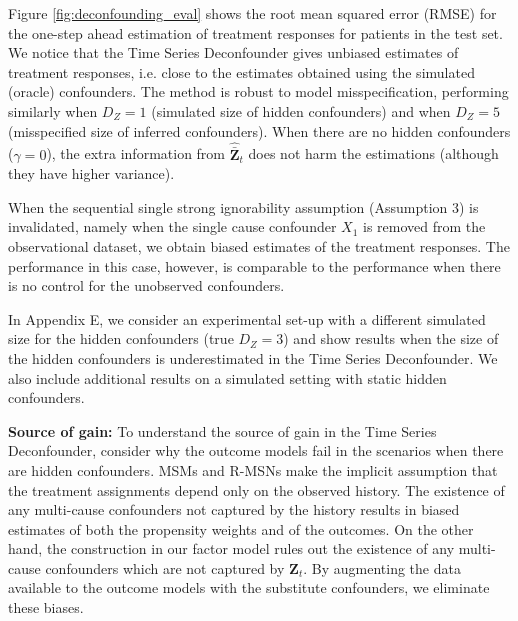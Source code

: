 \documentclass{article}
\newcommand{\vc}[1]{\mathbf{#1}}
\newcommand{\hist}[1]{\bar{\vc{#1}}}
\begin{document}
	Figure \ref{fig:deconfounding_eval} shows the root mean squared error (RMSE) for the one-step ahead estimation of treatment responses for patients in the test set. We notice that the Time Series Deconfounder gives unbiased estimates of treatment responses, i.e. close to the estimates obtained using the simulated (oracle) confounders.  The method is robust to model misspecification, performing similarly when $D_Z= 1$ (simulated size of hidden confounders) and when $D_Z=5$ (misspecified size of inferred confounders). When there are no hidden confounders ($\gamma = 0$), the extra information from $\hat{\hist{Z}}_t$ does not harm the estimations (although they have higher variance). 
	
	When the sequential single strong ignorability assumption (Assumption 3) is invalidated, namely when the single cause confounder $X_1$ is removed from the observational dataset, we obtain biased estimates of the treatment responses. The performance in this case, however, is comparable to the performance when there is no control for the unobserved confounders.     
	
    In Appendix E, we consider an experimental set-up with a 
    different simulated size for the hidden confounders (true $D_Z = 3$) and show results when the size of the hidden confounders is underestimated in the Time Series Deconfounder. We also include 
    additional results on a simulated setting with static hidden confounders. 
	
	\textbf{Source of gain:}   To understand the source of gain in the Time Series Deconfounder, consider why the outcome models fail in the scenarios when there are hidden confounders. MSMs and R-MSNs make the implicit assumption that the treatment assignments depend only on the observed history.  The existence of any multi-cause confounders not captured by the history results in biased estimates of both the propensity weights and of the outcomes. On the other hand, the construction in our factor model rules out the existence of any multi-cause confounders which are not captured by $\vc{Z}_t$. By augmenting the data available to the outcome models with the substitute confounders, we eliminate these biases. 
	
\end{document}
